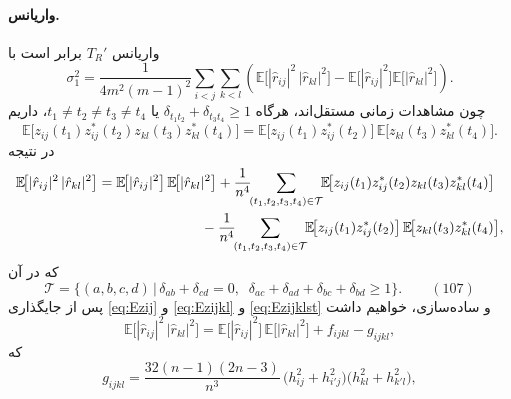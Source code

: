 \begin{اثبات}
	\paragraph{واریانس.}
	واریانس \(T_{R}'\) برابر است با
	\begin{equation}
		\sigma_{1}^{2}
		=\frac{1}{4m^{2}(m-1)^{2}}
		\sum_{i<j}\sum_{k<l}\!\left(
		\mathbb{E}\!\big[|\hat r_{ij}|^{2}\,|\hat r_{kl}|^{2}\big]
		-\mathbb{E}\!\big[|\hat r_{ij}|^{2}\big]\mathbb{E}\!\big[|\hat r_{kl}|^{2}\big]\right).
	\end{equation}
	چون مشاهدات زمانی مستقل‌اند، هرگاه
	\(\delta_{t_{1}t_{2}}+\delta_{t_{3}t_{4}}\ge 1\) یا \(t_{1}\neq t_{2}\neq t_{3}\neq t_{4}\)،
	داریم
	\begin{equation}
		\mathbb{E}\!\big[z_{ij}(t_{1})z_{ij}^{*}(t_{2})z_{kl}(t_{3})z_{kl}^{*}(t_{4})\big]
		=\mathbb{E}\!\big[z_{ij}(t_{1})z_{ij}^{*}(t_{2})\big]\,
		\mathbb{E}\!\big[z_{kl}(t_{3})z_{kl}^{*}(t_{4})\big].
	\end{equation}
	در نتیجه
	\begin{equation}
		\begin{aligned}
			\mathbb{E}\!\big[|\hat r_{ij}|^{2}\,|\hat r_{kl}|^{2}\big]
			&=\mathbb{E}\!\big[|\hat r_{ij}|^{2}\big]\,
			\mathbb{E}\!\big[|\hat r_{kl}|^{2}\big]
			+\frac{1}{n^{4}}\!\!\sum_{(t_{1},t_{2},t_{3},t_{4})\in\mathcal{T}}
			\!\!\mathbb{E}\!\big[z_{ij}(t_{1})z_{ij}^{*}(t_{2})z_{kl}(t_{3})z_{kl}^{*}(t_{4})\big]\\
			&\hspace{2.6cm}
			-\frac{1}{n^{4}}\!\!\sum_{(t_{1},t_{2},t_{3},t_{4})\in\mathcal{T}}
			\!\!\mathbb{E}\!\big[z_{ij}(t_{1})z_{ij}^{*}(t_{2})\big]\,
			\mathbb{E}\!\big[z_{kl}(t_{3})z_{kl}^{*}(t_{4})\big],
		\end{aligned}
	\end{equation}
	که در آن
	\[
	\mathcal{T}=\big\{(a,b,c,d)\,\big|\,\delta_{ab}+\delta_{cd}=0,\;\;
	\delta_{ac}+\delta_{ad}+\delta_{bc}+\delta_{bd}\ge 1\big\}. \qquad (107)
	\]
	پس از جایگذاری \eqref{eq:Ezij} و \eqref{eq:Ezijkl} و \eqref{eq:Ezijklst} و ساده‌سازی، خواهیم داشت
	\begin{equation}
		\mathbb{E}\!\big[|\hat r_{ij}|^{2}\,|\hat r_{kl}|^{2}\big]
		=\mathbb{E}\!\big[|\hat r_{ij}|^{2}\big]\,
		\mathbb{E}\!\big[|\hat r_{kl}|^{2}\big]
		+ f_{ijkl}-g_{ijkl},
	\end{equation}
	که
	\begin{equation}
		g_{ijkl}=\frac{32(n-1)(2n-3)}{n^{3}}\,
		\big(h_{ij}^{2}+h_{i'j}^{2}\big)\big(h_{kl}^{2}+h_{k'l}^{2}\big),
	\end{equation}

\end{اثبات}
